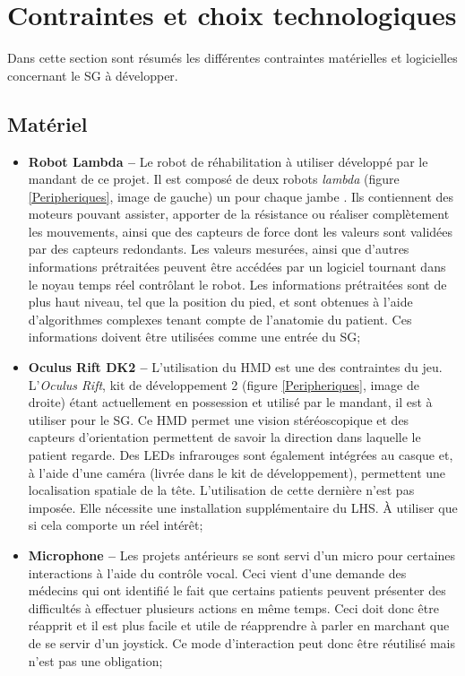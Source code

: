 \section{Contraintes et choix technologiques}
	\label{sAnaContraintes}
	Dans cette section sont résumés les différentes contraintes matérielles et logicielles concernant le SG à développer.
		\subsection*{Matériel} 
			\begin{itemize}
				\item \textbf{Robot Lambda --} Le robot de réhabilitation à utiliser développé par le mandant de ce projet. Il est composé de deux robots \textit{lambda} (figure \ref{Peripheriques}, image de gauche) un pour chaque jambe \cite{LHS_website}. Ils contiennent des moteurs pouvant assister, apporter de la résistance ou réaliser complètement les mouvements, ainsi que des capteurs de force dont les valeurs sont validées par des capteurs redondants. Les valeurs mesurées, ainsi que d'autres informations prétraitées peuvent être accédées par un logiciel tournant dans le noyau temps réel contrôlant le robot. Les informations prétraitées sont de plus haut niveau, tel que la position du pied, et sont obtenues à l'aide d'algorithmes complexes tenant compte de l'anatomie du patient. Ces informations doivent être utilisées comme une entrée du SG;	
				
				\item \textbf{Oculus Rift DK2 --} L'utilisation du HMD est une des contraintes du jeu. L'\textit{Oculus Rift}, kit de développement 2 \cite{OculusDk2_website} (figure \ref{Peripheriques}, image de droite) étant actuellement en possession et utilisé par le mandant, il est à utiliser pour le SG. Ce HMD permet une vision stéréoscopique et des capteurs d'orientation permettent de savoir la direction dans laquelle le patient regarde. Des LEDs infrarouges sont également intégrées au casque et, à l'aide d'une caméra (livrée dans le kit de développement), permettent une localisation spatiale de la tête. L'utilisation de cette dernière n'est pas imposée. Elle nécessite une installation supplémentaire du LHS. À utiliser que si cela comporte un réel intérêt;
				
				\item \textbf{Microphone --} Les projets antérieurs se sont servi d'un micro pour certaines interactions à l'aide du contrôle vocal. Ceci vient d'une demande des médecins qui ont identifié le fait que certains patients peuvent présenter des difficultés à effectuer plusieurs actions en même temps. Ceci doit donc être réapprit et il est plus facile et utile de réapprendre à parler en marchant que de se servir d'un joystick. Ce mode d'interaction peut donc être réutilisé mais n'est pas une obligation;
				

\end{itemize}
